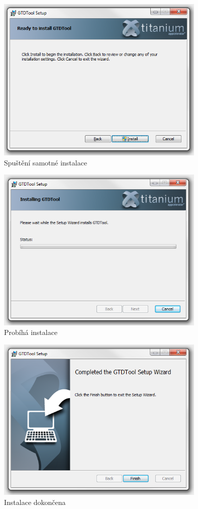 \documentclass[11pt,oneside,a4paper]{book}
\begin{document}
\begin{figure}[h]
	\begin{center}
		\includegraphics[width=10cm]{figures/install/04.png}
		\caption{Spuštění samotné instalace}
		\label{fig:install-04}
	\end{center}
\end{figure}

\begin{figure}[h]
	\begin{center}
		\includegraphics[width=10cm]{figures/install/05.png}
		\caption{Probíhá instalace}
		\label{fig:install-05}
	\end{center}
\end{figure}

\begin{figure}[h]
	\begin{center}
		\includegraphics[width=10cm]{figures/install/06.png}
		\caption{Instalace dokončena}
		\label{fig:install-06}
	\end{center}
\end{figure}
\end{document}

